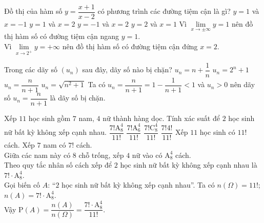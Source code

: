 \begin{ex}%
	Đồ thị của hàm số $y=\dfrac{x+1}{x-2}$ có phương trình các đường tiệm cận là gì?
	\choice
	{$y=1$ và $x=-1$}
	{\True $y=1$ và $x=2$}
	{$y=-1$ và $x=2$}
	{$y=2$ và $x=1$}
	\loigiai
	{
		Vì  $\lim\limits_{x\to\pm\infty}y=1$ nên đồ thị hàm số có đường tiệm cận ngang $y=1$.\\
		Vì $\lim\limits_{x\to2^+}y=+\infty$ nên đồ thị hàm số có đường tiệm cận đứng $x=2$.
	}
\end{ex}

\begin{ex}%
	Trong các dãy số $(u_n)$ sau đây, dãy số nào bị chặn?
	\choice
	{$u_n=n+\dfrac{1}{n}$}
	{$u_n=2^n+1$}
	{\True $u_n=\dfrac{n}{n+1}$}
	{$u_n=\sqrt{n^2+1}$}
	\loigiai
	{
		Ta có $u_n=\dfrac{n}{n+1}=1-\dfrac{1}{n+1}<1
		$ và $u_n>0$ nên dãy số $u_n=\dfrac{n}{n+1}$ là dãy số bị chặn.
	}
\end{ex}

\begin{ex}%
	Xếp $11$ học sinh gồm $7$ nam, $4$ nữ thành hàng dọc. Tính xác suất để $2$ học sinh nữ bất kỳ không xếp cạnh nhau.
	\choice
	{\True $\dfrac{7!\mathrm{A}^4_8}{11!}$}
	{$\dfrac{7!\mathrm{A}^4_6}{11!}$}
	{$\dfrac{7!\mathrm{C}^4_8}{11!}$}
	{$\dfrac{7!4!}{11!}$}
	\loigiai
	{
		Xếp $11$ học sinh có $11!$ cách. Xếp $7$ nam có $7!$ cách.\\
		Giữa các nam này có $8$ chỗ trống, xếp $4$ nữ vào có $\mathrm{A}_8^4$ cách.\\
		Theo quy tắc nhân số cách xếp để $2$ học sinh nữ bất kỳ không xếp cạnh nhau là $7!\cdot \mathrm{A}_8^4$.\\
		Gọi biến cố $A$: ``$2$ học sinh nữ bất kỳ không xếp cạnh nhau''.
		Ta có $n(\Omega)=11!$; $n(A)=7!\cdot \mathrm{A}_8^4$.\\
		Vậy $\mathrm{P}(A)=\dfrac{n(A)}{n(\Omega)}=\dfrac{7!\cdot \mathrm{A}_8^4}{11!}$.
	}
\end{ex}

